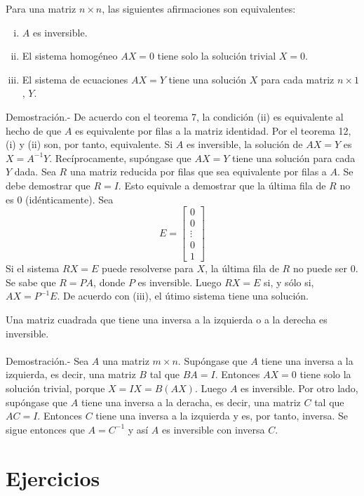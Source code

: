 \begin{teo}
    Para una matriz $n\times n$, las siguientes afirmaciones son equivalentes:
    \begin{enumerate}[(i)]
	\item $A$ es inversible.
	\item El sistema homogéneo $AX=0$ tiene solo la solución trivial $X=0$.
	\item El sistema de ecuaciones $AX=Y$ tiene una solución $X$ para cada matriz $n\times 1$, $Y$.\\
    \end{enumerate}
	Demostración.-\; De acuerdo con el teorema 7, la condición (ii) es equivalente al hecho de que $A$ es equivalente por filas a la matriz identidad. Por el teorema 12, (i) y (ii) son, por tanto, equivalente. Si $A$ es inversible, la solución de $AX=Y$ es $X=A^{-1}Y$. Recíprocamente, supóngase que $AX=Y$ tiene una solución para cada $Y$ dada. Sea $R$ una matriz reducida por filas que sea equivalente por filas a $A$. Se debe demostrar que $R=I$. Esto equivale a demostrar que la última fila de $R$ no es $0$ (idénticamente). Sea
	$$
	E = 
	\left[
	    \begin{array}{c}
		0 \\
		0 \\
		\vdots \\
		0 \\
		1
	    \end{array}
	\right]
	$$
    Si el sistema $RX=E$ puede resolverse para $X$, la última fila de $R$ no puede ser $0$. Se sabe que $R=PA$, donde $P$ es inversible. Luego $RX=E$ si, y sólo si, $AX=P^{-1}E$. De acuerdo con (iii), el útimo sistema tiene una solución.
\end{teo}

\begin{cor}
    Una matriz cuadrada que tiene una inversa a la izquierda o a la derecha es inversible.\\\\
	Demostración.-\; Sea $A$ una matriz $m\times n$. Supóngase que $A$ tiene una inversa a la izquierda, es decir, una matriz $B$ tal que $BA=I$. Entonces $AX=0$ tiene solo la solución trivial, porque $X=IX=B(AX)$. Luego $A$ es inversible. Por otro lado, supóngase que $A$ tiene una inversa a la deracha, es decir, una matriz $C$ tal que $AC=I$. Entonces $C$ tiene una inversa a la izquierda y es, por tanto, inversa. Se sigue entonces que $A=C^{-1}$ y así $A$ es inversible con inversa $C$.
\end{cor}


\section*{Ejercicios}

